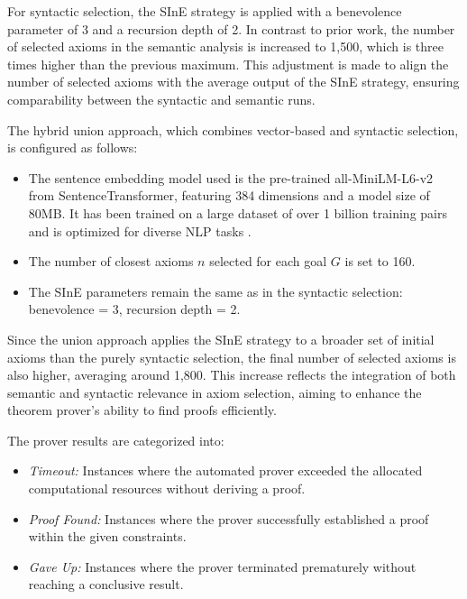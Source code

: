 \documentclass[english,version-2020-11]{uzl-thesis}
\begin{document}
For syntactic selection, the SInE strategy is applied with a benevolence parameter of 3 and a recursion depth of 2. In contrast to prior work, the number of selected axioms in the semantic analysis is increased to 1,500, which is three times higher than the previous maximum. This adjustment is made to align the number of selected axioms with the average output of the SInE strategy, ensuring comparability between the syntactic and semantic runs.

The hybrid union approach, which combines vector-based and syntactic selection, is configured as follows:

\begin{itemize}
    \item The sentence embedding model used is the pre-trained all-MiniLM-L6-v2 from SentenceTransformer, featuring 384 dimensions and a model size of 80MB. It has been trained on a large dataset of over 1 billion training pairs and is optimized for diverse NLP tasks \cite{Reimers2019, Sentencetransformers2019}.
    \item The number of closest axioms \( n \) selected for each goal \( G \) is set to 160.
    \item The SInE parameters remain the same as in the syntactic selection: benevolence = 3, recursion depth = 2.
\end{itemize}

Since the union approach applies the SInE strategy to a broader set of initial axioms than the purely syntactic selection, the final number of selected axioms is also higher, averaging around 1,800. This increase reflects the integration of both semantic and syntactic relevance in axiom selection, aiming to enhance the theorem prover’s ability to find proofs efficiently.

The prover results are categorized into:
\begin{itemize}
    \item \textit{Timeout:} Instances where the automated prover exceeded the allocated computational resources without deriving a proof.
    \item \textit{Proof Found:} Instances where the prover successfully established a proof within the given constraints.
    \item \textit{Gave Up:} Instances where the prover terminated prematurely without reaching a conclusive result.
\end{itemize}
\end{document}
